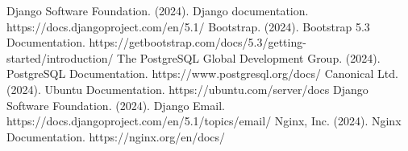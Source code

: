 \begin{thebibliography}{{}}
 Django Software Foundation. (2024). Django documentation. https://docs.djangoproject.com/en/5.1/
 Bootstrap. (2024). Bootstrap 5.3 Documentation. https://getbootstrap.com/docs/5.3/getting-started/introduction/
 The PostgreSQL Global Development Group. (2024). PostgreSQL Documentation. https://www.postgresql.org/docs/
 Canonical Ltd. (2024). Ubuntu Documentation. https://ubuntu.com/server/docs
 Django Software Foundation. (2024). Django Email. https://docs.djangoproject.com/en/5.1/topics/email/
 Nginx, Inc. (2024). Nginx Documentation. https://nginx.org/en/docs/
\end{thebibliography}
